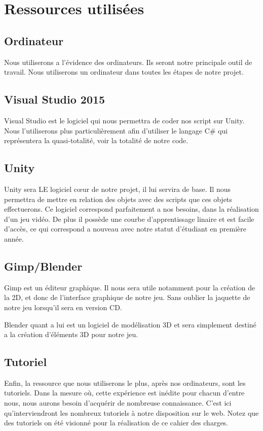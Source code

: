 \documentclass[a4paper, 12pt]{article}
\begin{document}
\section{Ressources utilisées}
	\subsection{Ordinateur}
	Nous utiliserons a l'évidence des ordinateurs. Ils seront notre principale outil de travail. Nous utiliserons un ordinateur dans toutes les étapes de notre projet. 
	\subsection{Visual Studio 2015}
	Visual Studio est le logiciel qui nous permettra de coder nos script sur Unity. Nous l'utiliserons plus particulièrement afin d'utiliser le langage C\# qui représentera la quasi-totalité, voir la totalité de notre code.
	\subsection{Unity}
	Unity sera LE logiciel cœur de notre projet, il lui servira de base. Il nous permettra de mettre en relation des objets avec des scripts que ces objets effectuerons. Ce logiciel correspond parfaitement a nos besoins, dans la réalisation d'un jeu vidéo. De plus il possède une courbe d'apprentissage linaire et est facile d'accès, ce qui correspond a nouveau avec notre statut d'étudiant en première année.
	\subsection{Gimp/Blender}
	Gimp est un éditeur graphique. Il nous sera utile notamment pour la création de la 2D, et donc de l'interface graphique de notre jeu. Sans oublier la jaquette de notre jeu lorsqu'il sera en version CD.
	\par Blender quant a lui est un logiciel de modélisation 3D et sera simplement destiné a la création d'éléments 3D pour notre jeu. 
	\subsection{Tutoriel}
	Enfin, la ressource que nous utiliserons le plus, après nos ordinateurs, sont les tutoriels. Dans la mesure où, cette expérience est inédite pour chacun d'entre nous, nous aurons besoin d'acquérir de nombreuse connaissance. C'est ici qu'interviendront les nombreux tutoriels à notre disposition sur le web. Notez que des tutoriels on été visionné pour la réalisation de ce cahier des charges.
	\newpage
\end{document}
